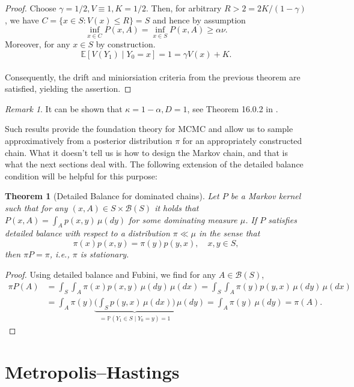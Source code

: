 \documentclass[
]{book}
\newtheorem{theorem}{Theorem}[chapter]
\theoremstyle{definition}
\theoremstyle{definition}
\theoremstyle{definition}
\theoremstyle{definition}
\theoremstyle{remark}
\newtheorem*{remark}{Remark}
\begin{document}
\begin{proof}
Choose \(\gamma = 1/2, V \equiv 1, K = 1/2\). Then, for arbitrary \(R > 2 = 2K/(1-\gamma)\), we have \(C = \{x \in S: V(x) \leq R\} = S\) and hence by assumption
\[\inf_{x \in C} P(x,A) = \inf_{x \in S} P(x,A)  \geq \alpha \nu.\]
Moreover, for any \(x \in S\) by construction.
\[\mathbb{E}[V(Y_1) \mid Y_0 = x] = 1 = \gamma V(x) +K.\]\\
Consequently, the drift and miniorsiation criteria from the previous theorem are satisfied, yielding the assertion.
\end{proof}

\begin{remark}
It can be shown that \(\kappa = 1 - \alpha, D=1\), see Theorem 16.0.2 in \citep{meyntweedie}.
\end{remark}

Such results provide the foundation theory for MCMC and allow us to sample approximatively from a posterior distribution \(\pi\) for an appropriately constructed chain. What it doesn't tell us is how to design the Markov chain, and that is what the next sections deal with. The following extension of the detailed balance condition will be helpful for this purpose:

\begin{theorem}[Detailed Balance for dominated chains]
\protect\hypertarget{thm:reversibility}{}\label{thm:reversibility}Let \(P\) be a Markov kernel such that for any \((x,A) \in S \times \mathcal{B}(S)\) it holds that \(P(x,A) = \int_A p(x,y) \,\mu(dy)\) for some dominating measure \(\mu\). If \(P\) satisfies detailed balance with respect to a distribution \(\pi \ll \mu\) in the sense that
\[\pi(x)p(x,y) = \pi(y)p(y,x), \quad x,y \in S,\]
then \(\pi P = \pi\), i.e., \(\pi\) is stationary.
\end{theorem}

\begin{proof}
Using detailed balance and Fubini, we find for any \(A \in \mathcal{B}(S)\),
\begin{align*} 
\pi P(A) &= \int_S \int_A \pi(x) p(x,y) \, \mu(dy)\, \mu(dx) =\int_S \int_A \pi(y) p(y,x) \, \mu(dy)\, \mu(dx)\\
&= \int_A \pi(y) \underbrace{\Big(\int_S p(y,x) \, \mu(dx)\Big)}_{= \mathbb{P}(Y_1 \in S \mid Y_0 = y) = 1} \, \mu(dy) = \int_A \pi(y) \, \mu(dy) = \pi(A). 
\end{align*}
\end{proof}

\hypertarget{metropolishastings}{%
\section{Metropolis--Hastings}\label{metropolishastings}}
\end{document}
